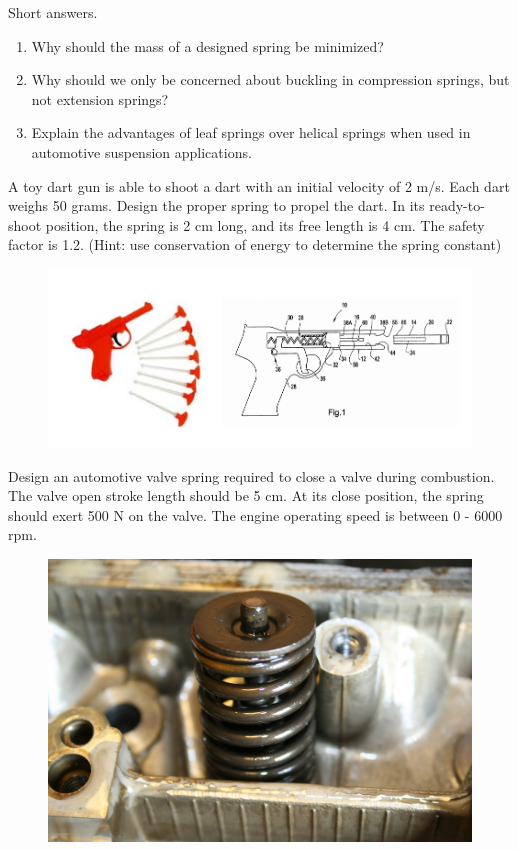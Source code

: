 \documentclass[
10pt,
a4paper,
openany,
svgnames,
]{book}
\newcommand{\exercise}{%
\item \label{lab:\arabic{chapter}.\arabic{exercisesi}}  %
}
\begin{document}
\begin{exercises}
  \exercise Short answers.
  \begin{enumerate}
  \item Why should the mass of a designed spring be minimized?
  \item Why should we only be concerned about buckling in compression springs, but not extension springs?
  \item Explain the advantages of leaf springs over helical springs when used in automotive suspension applications.
  \end{enumerate}
  
  \exercise A toy dart gun is able to shoot a dart with an initial velocity of 2 m/s. Each dart weighs 50 grams. Design the proper spring to propel the dart. In its ready-to-shoot position, the spring is 2 cm long, and its free length is 4 cm. The safety factor is 1.2. (Hint: use conservation of energy to determine the spring constant)
  \begin{figure}[H]
    \centering
    \includegraphics[scale=0.8]{pictures/Spring-design/toy-dart-gun}
  \end{figure}

  \exercise Design an automotive valve spring required to close a valve during combustion. The valve open stroke length should be 5 cm. At its close position, the spring should exert 500 N on the valve. The engine operating speed is between 0 - 6000 rpm.
  \begin{figure}[H]
    \centering
    \includegraphics[scale=0.2]{pictures/Spring-design/valve-spring}
  \end{figure}
\end{exercises}
\end{document}
